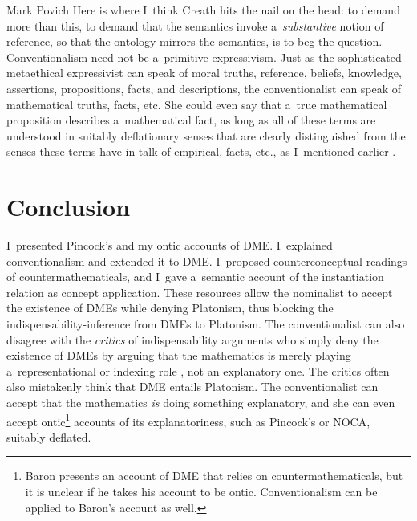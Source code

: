 \begin{artengenv}{Mark Povich}
Here is where I~think Creath
\parencite*[][]{creath_benacerraf_1980} %
 hits the nail on the head: to demand more than this, to demand that the semantics invoke a~\textit{substantive} notion of reference, so that the ontology mirrors the semantics, is to beg the question. Conventionalism need not be a~primitive expressivism. Just as the sophisticated metaethical expressivist 
 can speak of moral truths, reference, beliefs, knowledge, assertions, propositions, facts, and descriptions, the conventionalist can speak of mathematical truths, facts, etc. She could even say that a~true mathematical proposition describes a~mathematical fact, as long as all of these terms are understood in suitably deflationary senses that are clearly distinguished from the senses these terms have in talk of empirical, facts, etc., as I~mentioned earlier 
\parencites[][]{thomasson_norms_2020}[see also][]{baker_mathematical_2009}.%


\section{Conclusion}
I~presented Pincock's
\parencite*[][]{pincock_abstract_2015} %
 and my 
\parencite[][]{craver_constitutive_2021} %
 ontic accounts of DME. I~explained conventionalism and extended it to DME. I~proposed counterconceptual readings of countermathematicals, and I~gave a~semantic account of the instantiation relation as concept application. These resources allow the nominalist to accept the existence of DMEs while denying Platonism, thus blocking the indispensability-inference from DMEs to Platonism. The conventionalist can also disagree with the \textit{critics} of indispensability arguments who simply deny the existence of DMEs by arguing that the mathematics is merely playing a~representational 
\parencite[][]{saatsi_enhanced_2011} %
 or indexing role 
\parencite[][]{melia_weaseling_2000}, %
 not an explanatory one. The critics often also mistakenly think that DME entails Platonism. The conventionalist can accept that the mathematics \textit{is} doing something explanatory, and she can even accept ontic\footnote{Baron 
\parencite*[][]{baron_counterfactual_2020} %
 presents an account of DME that relies on countermathematicals, but it is unclear if he takes his account to be ontic. Conventionalism can be applied to Baron's account as well.} accounts of its explanatoriness, such as Pincock's or NOCA, suitably deflated.


\end{artengenv}
